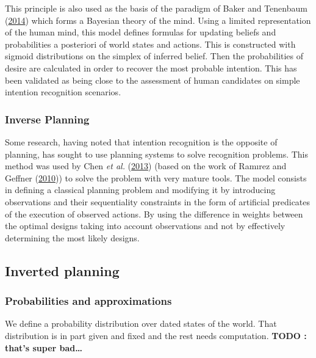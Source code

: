 \documentclass[11pt,a4paper,twoside,openright,titlepage,numbers=noenddot,headinclude,cleardoublepage=empty,openany]{scrreprt}
\theoremstyle{plain}
\theoremstyle{definition}
\theoremstyle{remark}
\begin{document}
This principle is also used as the basis of the paradigm of Baker and
Tenenbaum (\protect\hyperlink{ref-baker_modeling_2014}{2014}) which
forms a Bayesian theory of the mind. Using a limited representation of
the human mind, this model defines formulas for updating beliefs and
probabilities a posteriori of world states and actions. This is
constructed with sigmoid distributions on the simplex of inferred
belief. Then the probabilities of desire are calculated in order to
recover the most probable intention. This has been validated as being
close to the assessment of human candidates on simple intention
recognition scenarios.

\hypertarget{inverse-planning}{%
\subsubsection{Inverse Planning}\label{inverse-planning}}

Some research, having noted that intention recognition is the opposite
of planning, has sought to use planning systems to solve recognition
problems. This method was used by Chen \emph{et al.}
(\protect\hyperlink{ref-chen_planning_2013}{2013}) (based on the work of
Ramırez and Geffner
(\protect\hyperlink{ref-ramirez_probabilistic_2010}{2010})) to solve the
problem with very mature tools. The model consists in defining a
classical planning problem and modifying it by introducing observations
and their sequentiality constraints in the form of artificial predicates
of the execution of observed actions. By using the difference in weights
between the optimal designs taking into account observations and not by
effectively determining the most likely designs.

\hypertarget{inverted-planning}{%
\subsection{Inverted planning}\label{inverted-planning}}

\hypertarget{probabilities-and-approximations}{%
\subsubsection{Probabilities and
approximations}\label{probabilities-and-approximations}}

We define a probability distribution over dated states of the world.
That distribution is in part given and fixed and the rest needs
computation. \textbf{TODO : that's super bad\ldots{}}
\end{document}
